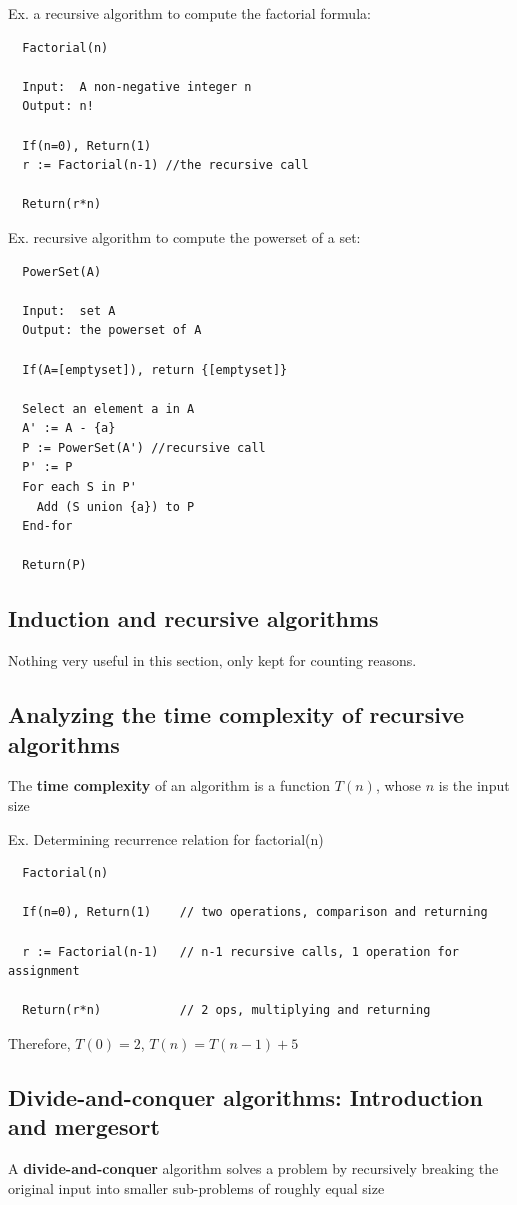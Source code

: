 Ex. a recursive algorithm to compute the factorial formula:
\begin{lstlisting}
  Factorial(n)

  Input:  A non-negative integer n
  Output: n!

  If(n=0), Return(1)
  r := Factorial(n-1) //the recursive call

  Return(r*n)
\end{lstlisting}

Ex. recursive algorithm to compute the powerset of a set:
\begin{lstlisting}
  PowerSet(A)

  Input:  set A
  Output: the powerset of A

  If(A=[emptyset]), return {[emptyset]}

  Select an element a in A
  A' := A - {a}
  P := PowerSet(A') //recursive call
  P' := P
  For each S in P'
    Add (S union {a}) to P
  End-for

  Return(P)
\end{lstlisting}


\subsection{Induction and recursive algorithms}
Nothing very useful in this section, only kept for counting reasons.

\subsection{Analyzing the time complexity of recursive algorithms}
The \textbf{time complexity} of an algorithm is a function $T(n)$, whose $n$ is the input size

Ex. Determining recurrence relation for factorial(n)
\begin{lstlisting}
  Factorial(n)

  If(n=0), Return(1)    // two operations, comparison and returning

  r := Factorial(n-1)   // n-1 recursive calls, 1 operation for assignment

  Return(r*n)           // 2 ops, multiplying and returning
\end{lstlisting}
Therefore, $T(0) = 2$, $T(n) = T(n-1) + 5$

\subsection{Divide-and-conquer algorithms: Introduction and mergesort}
A \textbf{divide-and-conquer} algorithm solves a problem by recursively breaking
the original input into smaller sub-problems of roughly equal size

